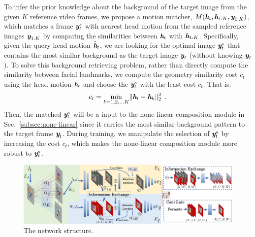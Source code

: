\documentclass[runningheads]{llncs}
\def\mathbi#1{\textbf{\em #1}}
\begin{document}
\indent To infer the prior knowledge about the background of the target image from the given $K$ reference video frames, we propose a motion matcher, $M(\hat{\mathbi{h}}_t, \mathbi{h}_{1:K}, \mathbi{y}_{1:K})$, which matches a frame $\mathbi{y}_t^s$ with nearest head motion from the sampled reference images $\mathbi{y}_{1:K}$ by comparing the similarities between $\mathbi{h}_{t}$ with $\mathbi{h}_{1:K}$. Specifically, given the query head motion $\hat{\mathbi{h}}_t$, we are looking for the optimal image $\mathbi{y}_t^s$ that contains the most similar background as the target image $\mathbi{y}_t$ (without knowing $\mathbi{y}_t$). To solve this background retrieving problem, rather than directly compute the similarity between facial landmarks, we compute the geometry similarity cost $c_{t}$ using the head motion $\mathbi{h}_t$ and choose the $\mathbi{y}_t^s$ with the least cost $c_t$. That is:
\begin{equation}
\begin{aligned}
c_{t}= \min_{k=1,2,...K}  \lVert \mathbi{h}_t - \mathbi{h}_k \rVert^2_2 \enspace.
\end{aligned}
\label{eq:cost}    
\end{equation}
  Then, the matched $\mathbi{y}_t^s$ will be a input to the none-linear composition module in Sec.~\ref{subsec:none-linear} since it carries the most similar background pattern to the target frame ${\mathbi{y}}_t$. During training, we manipulate the selection of $\mathbi{y}_t^s$ by increasing the cost $c_{t}$, which makes the none-linear composition module more robust to $\mathbi{y}_t^s$.  
 \begin{figure}[t]
\includegraphics[width= \linewidth]{latex/images/attention.png}
\caption{The network structure.}
\label{fig:attention}
\end{figure}
\end{document}
